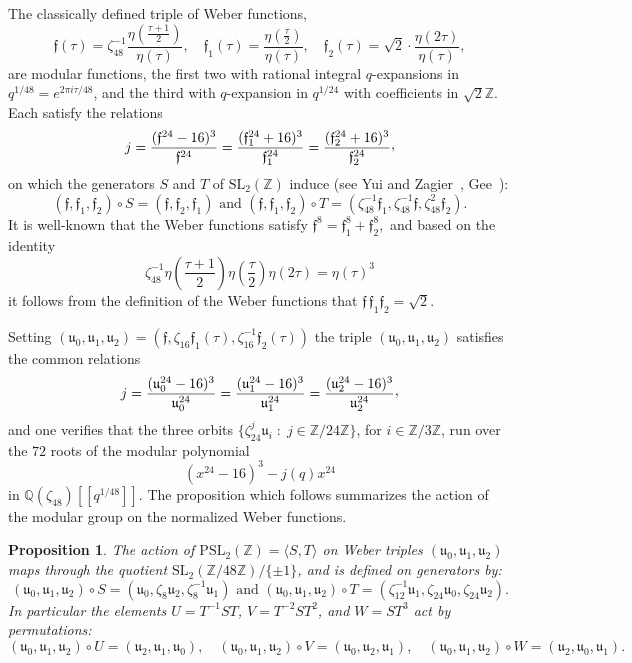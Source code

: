 \documentclass{amsart}
\newcommand{\QQ}{\mathbb{Q}}
\newcommand{\ZZ}{\mathbb{Z}}
\newcommand{\SL}{\mathrm{SL}}
\newcommand{\PSL}{\mathrm{PSL}}
\newcommand{\ff}{\mathfrak{f}}
\newcommand{\uu}{\mathfrak{u}}
\newcommand{\ccomma}{\raisebox{0.4ex}{,}}
\newtheorem{proposition}[theorem]{Proposition}
\begin{document}
The classically defined triple of Weber functions,
$$
\ff(\tau) = \zeta_{48}^{-1} \frac{\eta\left(\frac{\tau+1}{2}\right)}{\eta(\tau)},
\quad
\ff_1(\tau) = \frac{\eta\left(\frac{\tau}{2}\right)}{\eta(\tau)},
\quad
\ff_2(\tau) = \sqrt{2}\cdot\frac{\eta(2\tau)}{\eta(\tau)},
$$
are modular functions, the first two with rational integral $q$-expansions
in $q^{1/48} = e^{2\pi{i}\tau/48}$, and the third with $q$-expansion in 
$q^{1/24}$ with coefficients in $\sqrt{2}\ZZ$.
Each satisfy the relations
$$
j = \frac{(\ff^{24}-16)^3}{\ff^{24}}
  = \frac{(\ff_1^{24}+16)^3}{\ff_1^{24}}
  = \frac{(\ff_2^{24}+16)^3}{\ff_2^{24}}\ccomma
$$
on which the generators $S$ and $T$ of $\SL_2(\ZZ)$ induce (see Yui and
Zagier~\cite{YuiZagier97}, Gee~\cite{Gee99}):
\begin{equation}
\label{Weber_transform:Gee}
(\ff,\ff_1,\ff_2) \circ S = (\ff,\ff_2,\ff_1)  \mbox{ and }
(\ff,\ff_1,\ff_2) \circ T = (\zeta_{48}^{-1}\ff_1,\zeta_{48}^{-1}\ff,\zeta_{48}^2\ff_2).
\end{equation}
It is well-known that the Weber functions satisfy
$
\ff^8 = \ff_1^8 + \ff_2^8,
$
and based on the identity
$$
\zeta_{48}^{-1}\eta\left(\frac{\tau+1}{2}\right)\eta\left(\frac{\tau}{2}\right)\eta(2\tau) = \eta(\tau)^3
$$
it follows from the definition of the Weber functions that $\ff\, \ff_1 \ff_2 = \sqrt{2}$.

Setting
$(\uu_0,\uu_1,\uu_2) = (\ff,\zeta_{16}\ff_1(\tau),\zeta_{16}^{-1}\ff_2(\tau))$
the triple $(\uu_0,\uu_1,\uu_2)$ satisfies the common relations
$$
j = \frac{(\uu_0^{24}-16)^3}{\uu_0^{24}} = \frac{(\uu_1^{24}-16)^3}{\uu_1^{24}} = \frac{(\uu_2^{24}-16)^3}{\uu_2^{24}}\ccomma
$$
and one verifies that the three orbits $\{ \zeta_{24}^j \uu_i \;:\; j \in \ZZ/24\ZZ \}$, for $i \in \ZZ/3\ZZ$, 
run over the $72$ roots of the modular polynomial
$$
(x^{24} - 16)^3 - j(q) x^{24}
$$
in $\QQ(\zeta_{48})[\![q^{1/48}]\!]$.  The proposition which follows summarizes the action
of the modular group on the normalized Weber functions.

\begin{proposition}
  \label{prop:Weber_group_action}
The action of $\PSL_2(\ZZ) = \langle{S,T}\rangle$ on Weber triples $(\uu_0,\uu_1,\uu_2)$
maps through the quotient $\SL_2(\ZZ/48\ZZ)/\{\pm1\}$, and is defined on generators by:
$$
(\uu_0,\uu_1,\uu_2) \circ S = (\uu_0,\zeta_{8}\uu_2,\zeta_{8}^{-1}\uu_1)  \mbox{ and }
(\uu_0,\uu_1,\uu_2) \circ T = (\zeta_{12}^{-1}\uu_1,\zeta_{24}\uu_0,\zeta_{24}\uu_2).
$$
In particular the elements $U = T^{-1}ST$, $V = T^{-2}ST^2$, and $W = ST^3$ act by permutations:
$$
(\uu_0,\uu_1,\uu_2) \circ U = (\uu_2,\uu_1,\uu_0),\quad
(\uu_0,\uu_1,\uu_2) \circ V = (\uu_0,\uu_2,\uu_1),\quad
(\uu_0,\uu_1,\uu_2) \circ W = (\uu_2,\uu_0,\uu_1).
$$
\end{proposition}
\end{document}
